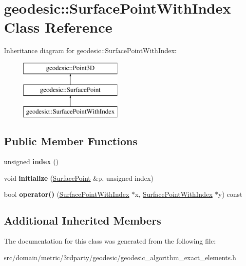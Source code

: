 \hypertarget{classgeodesic_1_1_surface_point_with_index}{}\section{geodesic\+:\+:Surface\+Point\+With\+Index Class Reference}
\label{classgeodesic_1_1_surface_point_with_index}
Inheritance diagram for geodesic\+:\+:Surface\+Point\+With\+Index\+:\begin{figure}[H]
\begin{center}
\leavevmode
\includegraphics[height=3.000000cm]{classgeodesic_1_1_surface_point_with_index}
\end{center}
\end{figure}
\subsection*{Public Member Functions}
\begin{DoxyCompactItemize}
\item 
\hypertarget{classgeodesic_1_1_surface_point_with_index_a84c5bfdf43431ae2b96a68d7930f9c9b}{}unsigned {\bfseries index} ()\label{classgeodesic_1_1_surface_point_with_index_a84c5bfdf43431ae2b96a68d7930f9c9b}

\item 
\hypertarget{classgeodesic_1_1_surface_point_with_index_ad80313d812cf69f12c1a0d4d99e3254d}{}void {\bfseries initialize} (\hyperlink{classgeodesic_1_1_surface_point}{Surface\+Point} \&p, unsigned index)\label{classgeodesic_1_1_surface_point_with_index_ad80313d812cf69f12c1a0d4d99e3254d}

\item 
\hypertarget{classgeodesic_1_1_surface_point_with_index_a716b60a83e0f2758cd27ad0d4fdc19ed}{}bool {\bfseries operator()} (\hyperlink{classgeodesic_1_1_surface_point_with_index}{Surface\+Point\+With\+Index} $\ast$x, \hyperlink{classgeodesic_1_1_surface_point_with_index}{Surface\+Point\+With\+Index} $\ast$y) const \label{classgeodesic_1_1_surface_point_with_index_a716b60a83e0f2758cd27ad0d4fdc19ed}

\end{DoxyCompactItemize}
\subsection*{Additional Inherited Members}


The documentation for this class was generated from the following file\+:\begin{DoxyCompactItemize}
\item 
src/domain/metric/3rdparty/geodesic/geodesic\+\_\+algorithm\+\_\+exact\+\_\+elements.\+h\end{DoxyCompactItemize}
